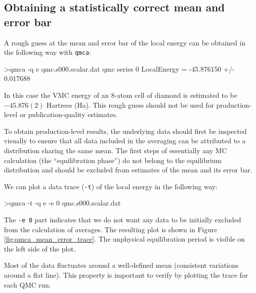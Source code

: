 \subsection{Obtaining a statistically correct mean and error bar}
\label{sec:qmca_mean_error}
A rough guess at the mean and error bar of the local energy can be 
obtained in the following way with \texttt{qmca}:
\begin{shade}
>qmca -q e qmc.s000.scalar.dat 
qmc  series 0  LocalEnergy           =  -45.876150 +/- 0.017688 
\end{shade}
\noindent
In this case the VMC energy of an 8-atom cell of diamond is estimated 
to be $-45.876(2)$ Hartrees (Ha).  This rough guess should not be used 
for production-level or publication-quality estimates.

To obtain production-level results, the underlying data should first be 
inspected visually to ensure that all data included in the averaging 
can be attributed to a distribution sharing the same mean.  The first 
steps of essentially any MC calculation (the ``equilibration 
phase'') do not belong to the equilibrium distribution and should be 
excluded from estimates of the mean and its error bar.

We can plot a data trace (\texttt{-t}) of the local energy in the 
following way:
\begin{shade}
>qmca -t -q e -e 0 qmc.s000.scalar.dat
\end{shade}
\noindent
The \texttt{-e 0} part indicates that we do not want any data 
to be initially excluded from the calculation of averages.  The resulting 
plot is shown in Figure \ref{fig:qmca_mean_error_trace}.  The unphysical 
equilibration period is visible on the left side of the plot.

Most of the data fluctuates around a well-defined mean (consistent 
variations around a flat line).  This property is important to verify  
by plotting the trace for each QMC run. 

